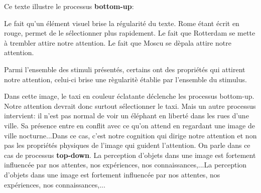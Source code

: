 Ce texte illustre le processus \textbf{bottom-up}:

Le fait qu'un \'el\'ement visuel brise la r\'egularit\'e du texte. Rome \'etant \'ecrit en rouge, permet de le s\'electionner plus rapidement. 
Le fait que Rotterdam se mette \`a trembler attire notre attention.
Le fait que Moscu se d\`epala attire notre attention.

Parmi l'ensemble des stimuli pr\'esent\'es, certains ont des propri\'et\'es qui attirent notre attention, celui-ci brise une r\`egularit\`e \'etablie par l'ensemble du stimulus.

\begin{figure}[H]
\centering
{}
\end{figure}

Dans cette image, le taxi en couleur \'eclatante d\'eclenche les processus bottom-up. Notre attention devrait donc surtout s\'electionner le taxi. Mais un autre processus intervient: il n'est pas normal de voir un \'el\'ephant en libert\'e dans les rues d'une ville. Sa pr\'esence entre en conflit avec ce qu'on attend en regardant une image de ville nocturne...Dans ce cas, c'est notre cognition qui dirige notre attention et non pas les propri\'et\'es physiques de l'image qui guident l'attention. On parle dans ce cas de processus \textbf{top-down}. La perception d'objets dans une image est fortement influenc\'ee par nos attentes, nos exp\'eriences, nos connaissances,...La perception d'objets dans une image est fortement influenc\'ee par nos attentes, nos exp\'eriences, nos connaissances,...

